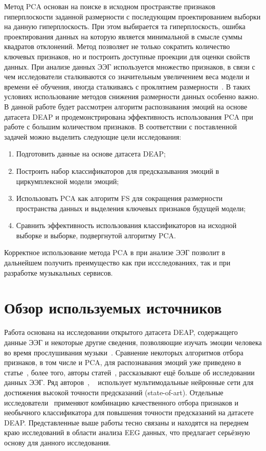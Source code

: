 \documentclass{article}
\begin{document}
Метод PCA основан на поиске в исходном пространстве признаков гиперплоскости заданной размерности с последующим проектированием выборки на данную гиперплоскость. При этом выбирается та гиперплоскость, ошибка проектирования данных на которую является минимальной в смысле суммы квадратов отклонений. Метод позволяет не только сократить количество ключевых признаков, но и построить доступные проекции для оценки свойств данных.
При анализе данных ЭЭГ используется множество признаков, в связи с чем исследователи сталкиваются со значительным увеличением веса модели и времени её обучения, иногда сталкиваясь с проклятием размерности~\cite{Powell}. В таких условиях использование методов снижения размерности данных особенно важно. В данной работе будет рассмотрен алгоритм распознавания эмоций на основе датасета DEAP и продемонстрирована эффективность использования PCA при работе с большим количеством признаков. В соответствии с поставленной задачей можно выделить следующие цели исследования:
\begin{enumerate}
\item Подготовить данные на основе датасета DEAP;
\item Построить набор классификаторов для предсказывания эмоций в циркумплексной модели эмоций;
\item Использовать PCA как алгоритм FS для сокращения размерности пространства данных и выделения ключевых признаков будущей модели;
\item Сравнить эффективность использования классификаторов на исходной выборке и выборке, подвергнутой алгоритму PCA.
\end{enumerate}

Корректное использование метода PCA в при анализе ЭЭГ позволит в дальнейшем получить преимущество как при иссследованиях, так и при разработке музыкальных сервисов.

\section{Обзор используемых источников}
Работа основана на исследовании открытого датасета DEAP, содержащего данные ЭЭГ и некоторые другие сведения, позволяющие изучать эмоции человека во время прослушивания музыки~\cite{Koelstra}. Сравнение некоторых алгоритмов отбора признаков, в том числе и PCA, для распознавания эмоций уже приведено в статье~\cite{Nawaz}, более того, авторы статей~\cite{Tandle}, \cite{Scherer} рассказывают ещё больше об исследовании данных ЭЭГ. Ряд авторов~\cite{Zhao}, ~\cite{Zheng} использует мультимодальные нейронные сети для достижения высокой точности предсказаний (state-of-art). Отдельные исследователи~\cite{Atkinson} применяют комбинацию качественного отбора признаков и необычного классификатора для повышения точности предсказаний на датасете DEAP. Представленные выше работы тесно связаны и находятся на переднем краю исследований в области анализа EEG данных, что предлагает серьёзную основу для данного исследования.
\end{document}
